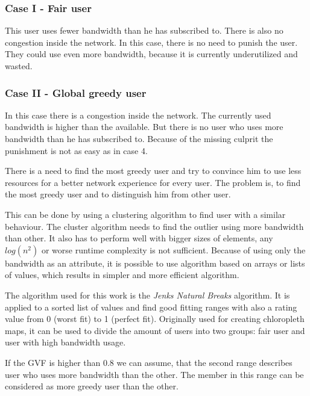 \documentclass[thesis.tex]{subfiles}
\begin{document}
\subsubsection{Case I - Fair user} \label{sub:main:detection:case1}
This user uses fewer bandwidth than he has subscribed to. There is also no congestion inside the network. In this case, there is no need to punish the user. They could use even more bandwidth, because it is currently underutilized and wasted.

\subsubsection{Case II - Global greedy user}
In this case there is a congestion inside the network. The currently used bandwidth is higher than the available. But there is no user who uses more bandwidth than he has subscribed to. Because of the missing culprit the punishment is not as easy as in case 4.

There is a need to find the most greedy user and try to convince him to use less resources for a better network experience for every user. The problem is, to find the most greedy user and to distinguish him from other user.

This can be done by using a clustering algorithm to find user with a similar behaviour. The cluster algorithm needs to find the outlier using more bandwidth than other. It also has to perform well with bigger sizes of elements, any $log(n^2)$ or worse runtime complexity is not sufficient. Because of using only the bandwidth as an attribute, it is possible to use algorithm based on arrays or lists of values, which results in simpler and more efficient algorithm.

The algorithm used for this work is the \textit{Jenks Natural Breaks} algorithm. 
It is applied to a sorted list of values and find good fitting ranges with also a rating value from 0 (worst fit) to 1 (perfect fit). Originally used for creating chloropleth maps, it can be used to divide the amount of users into two groups: fair user and user with high bandwidth usage. 


If the GVF is higher than 0.8 we can assume, that the second range describes user who uses more bandwidth than the other. The member in this range can be considered as more greedy user than the other.
\end{document}
